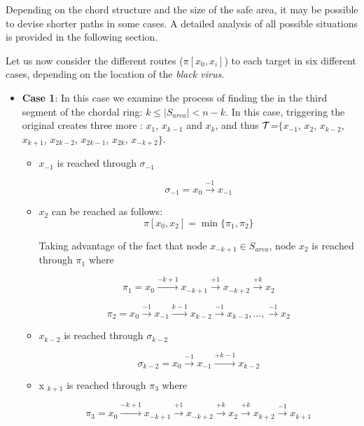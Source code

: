 Depending on the chord structure and the size of the safe area, it may be possible to devise shorter paths in some cases. A detailed analysis of all possible situations is provided in the following  section.
 


Let us now consider the different routes ($\pi[x_0,x_{i}] $) to each target in six different cases, depending on the location of the {\it black virus}.  
\begin{itemize}
\item {\bf Case 1}: In this case we examine the process of finding the \bv in the third segment of the chordal ring: $k\leq |S_{area}| <n-k$. In this case, triggering the original \bv creates three more \bvs: $x_{1}$, $x_{k-1}$ and $x_{k}$, and thus $\cal T$=$\{ x_{-1}$,  $x_{2}$, $x_{k-2}$, $x_{k+1}$, $x_{2k-2}$, $x_{2k-1}$, $x_{2k}$, $x_{-k+2}\}$. 
\begin{itemize}

\item  $x_{-1}$ is reached through  $\sigma_{-1}$ 
 
$$ \sigma_{-1} =  x_{0}\xrightarrow {-1}x_{-1}$$


\item  $x_{2}$  can be reached as follows:
$$ \pi[x_0,x_{2}] = \min \{   \pi_{1}, \pi_{2}\}$$

Taking advantage of the fact that node $x_{-k+1}\in S_{area}$, node  $x_{2}$ is reached through $\pi_1$ where 
 
$$\pi_1 =  x_{0}\xrightarrow {-k+1}x_{-k+1} \xrightarrow {+1}x_{-k+2}\xrightarrow {+k} x_{2}$$

$$\pi_2 =  x_{0}\xrightarrow {-1}x_{-1} \xrightarrow {k-1}x_{k-2}\xrightarrow {-1}x_{k-3},..., \xrightarrow {-1} x_{2}$$



\item  $x_{k-2}$  is reached through  $\sigma_{k-2}$ 
 
$$ \sigma_{k-2} =  x_{0}\xrightarrow {-1}x_{-1}\xrightarrow {+k-1}x_{k-2}$$




\item x $_ {k+1}$  is reached through $\pi_3$ where 
 
$$\pi_3 =  x_{0}\xrightarrow {-k+1}x_{-k+1} \xrightarrow {+1}x_{-k+2}\xrightarrow {+k} x_{2}\xrightarrow {+k} x_{k+2}\xrightarrow {-1} x_{k+1}$$
 


\end{itemize}
\end{itemize}
